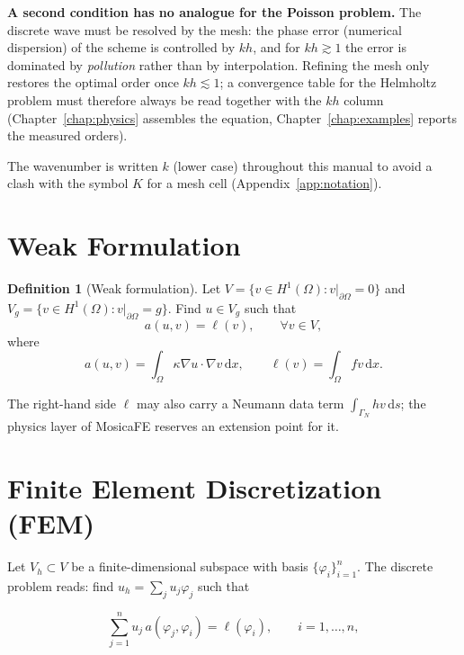 \documentclass[11pt,oneside]{book}
\theoremstyle{definition}
\newtheorem{definition}{Definition}[chapter]
\theoremstyle{plain}
\newenvironment{caution}{%
  \begin{tcolorbox}[colback=orange!5,colframe=orange!55,title=Caution,fonttitle=\bfseries]%
}{%
  \end{tcolorbox}%
}
\newcommand{\mosica}{\textsf{MosicaFE}}
\newcommand{\dif}{\,\mathrm{d}}
\begin{document}
\begin{caution}
\textbf{A second condition has no analogue for the Poisson problem.} The discrete
wave must be resolved by the mesh: the phase error (numerical dispersion) of the
scheme is controlled by $kh$, and for $kh\gtrsim1$ the error is dominated by
\emph{pollution} rather than by interpolation. Refining the mesh only restores the
optimal order once $kh\lesssim1$; a convergence table for the Helmholtz problem
must therefore always be read together with the $kh$ column (Chapter~\ref{chap:physics}
assembles the equation, Chapter~\ref{chap:examples} reports the measured orders).
\end{caution}

The wavenumber is written $k$ (lower case) throughout this manual to avoid a clash
with the symbol $K$ for a mesh cell (Appendix~\ref{app:notation}).

\section{Weak Formulation}

\begin{definition}[Weak formulation]
Let $V=\{v\in H^1(\Omega): v|_{\partial\Omega}=0\}$ and
$V_g=\{v\in H^1(\Omega): v|_{\partial\Omega}=g\}$. Find $u\in V_g$ such that
\begin{equation}
a(u,v)=\ell(v),\qquad \forall v\in V,
\label{eq:weak}
\end{equation}
where
\begin{equation}
a(u,v)=\int_\Omega \kappa\nabla u\cdot\nabla v\dif x,\qquad
\ell(v)=\int_\Omega f v\dif x .
\label{eq:bilinear}
\end{equation}
\end{definition}

The right-hand side $\ell$ may also carry a Neumann data term
$\int_{\Gamma_N} h v\dif s$; the physics layer of \mosica{} reserves an extension
point for it.

\section{Finite Element Discretization (FEM)}

Let $V_h\subset V$ be a finite-dimensional subspace with basis
$\{\varphi_i\}_{i=1}^n$. The discrete problem reads: find
$u_h=\sum_j u_j\varphi_j$ such that

\begin{equation}
\sum_{j=1}^n u_j\,a(\varphi_j,\varphi_i)=\ell(\varphi_i),\qquad i=1,\dots,n,
\label{eq:fem-system}
\end{equation}
\end{document}
